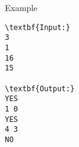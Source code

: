 Example
\begin{verbatim}
\textbf{Input:}
3
1
16
15

\textbf{Output:}
YES
1 0
YES
4 3
NO
\end{verbatim}
